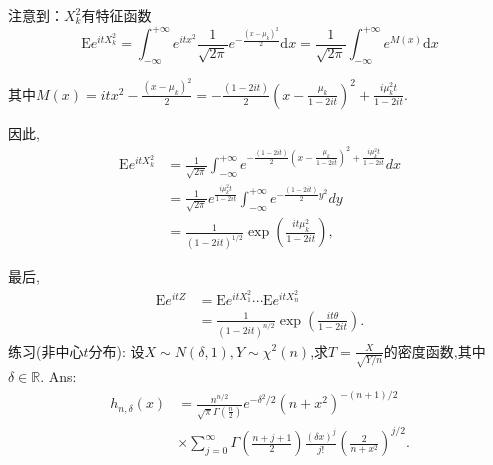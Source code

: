 	\begin{frame}
		注意到：$X_{k}^{2}$有特征函数
		\begin{equation}
			\mathrm{E}e^{itX_{k}^{2}}=\int_{-\infty }^{+\infty}{{{e}^{it{{x}^{2}}}}\frac{1}{\sqrt{2\pi }}{{e}^{-\frac{{{(x-{{\mu }_{k}})}^{2}}}{2}}}\mathrm{d}x}=\frac{1}{\sqrt{2\pi }}\int_{-\infty }^{+\infty }{{{e}^{M(x)}}\mathrm{d}x}
		\end{equation}
		
		其中$M(x)=it{{x}^{2}}-\frac{{{(x-{{\mu }_{k}})}^{2}}}{2}=-\frac{(1-2it)}{2}{{(x-\frac{{{\mu }_{k}}}{1-2it})}^{2}}+\frac{i\mu _{k}^{2}t}{1-2it}.$ 
		
		因此,
		\begin{equation}
			\begin{split}
					\mathrm{E}e^{itX_{k}^{2}} &=\frac{1}{\sqrt{2\pi }}\int_{-\infty }^{+\infty }{{{e}^{-\frac{(1-2it)}{2}{{(x-\frac{{{\mu }_{k}}}{1-2it})}^{2}}+\frac{i\mu _{k}^{2}t}{1-2it}}}dx} \\
					&=\frac{1}{\sqrt{2\pi }}{{e}^{\frac{i\mu _{k}^{2}t}{1-2it}}}\int_{-\infty }^{+\infty }{{{e}^{-\frac{(1-2it)}{2}{{y}^{2}}}}dy} \\
					&=\frac{1}{{{(1-2it)}^{1/2}}}\exp \left( \frac{it\mu _{k}^{2}}{1-2it} \right),
			\end{split}
		\end{equation}
		
	\end{frame}

	\begin{frame}
		最后,
		\begin{equation}
			\begin{split}
				\mathrm{E}e^{itZ} &= \mathrm{E}e^{itX_1^2}\cdots\mathrm{E}e^{itX_n^2} \\
				&= \frac{1}{{{(1-2it)}^{n/2}}}\exp \left( \frac{it\theta}{1-2it} \right).
			\end{split}
		\end{equation}
		练习(非中心$t$分布): 设$X\sim N(\delta,1),Y\sim \chi^2(n)$,求$T = \frac{X}{\sqrt{Y/n}}$的密度函数,其中$\delta\in\mathbb{R}$.
		Ans:
		\begin{equation}
			\begin{split}
				h_{n,\delta}(x) &= \frac{n^{n/2}}{\sqrt{\pi}\Gamma(\frac{n}{2})}e^{-\delta^2/2}(n+x^2)^{-(n+1)/2} \\
				&\times \sum_{j=0}^{\infty}\Gamma(\frac{n+j+1}{2})\frac{(\delta x)^j}{j!}(\frac{2}{n+x^2})^{j/2}.
			\end{split}
		\end{equation}
	\end{frame}

